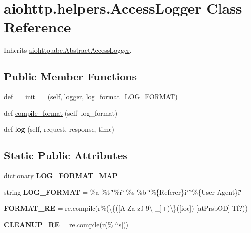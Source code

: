 \hypertarget{classaiohttp_1_1helpers_1_1_access_logger}{}\section{aiohttp.\+helpers.\+Access\+Logger Class Reference}
\label{classaiohttp_1_1helpers_1_1_access_logger}


Inherits \hyperlink{classaiohttp_1_1abc_1_1_abstract_access_logger}{aiohttp.\+abc.\+Abstract\+Access\+Logger}.

\subsection*{Public Member Functions}
\begin{DoxyCompactItemize}
\item 
def \hyperlink{classaiohttp_1_1helpers_1_1_access_logger_ad0d3b542f6036f62cd3c10593dd225a1}{\+\_\+\+\_\+init\+\_\+\+\_\+} (self, logger, log\+\_\+format=L\+O\+G\+\_\+\+F\+O\+R\+M\+AT)
\item 
def \hyperlink{classaiohttp_1_1helpers_1_1_access_logger_a9e53e1bdb16592c153a0ce7400acc1b8}{compile\+\_\+format} (self, log\+\_\+format)
\item 
\mbox{\label{classaiohttp_1_1helpers_1_1_access_logger_af5f0a5b71ffd18e9d121511216a8eb6d}} 
def {\bfseries log} (self, request, response, time)
\end{DoxyCompactItemize}
\subsection*{Static Public Attributes}
\begin{DoxyCompactItemize}
\item 
dictionary {\bfseries L\+O\+G\+\_\+\+F\+O\+R\+M\+A\+T\+\_\+\+M\+AP}
\item 
\mbox{\label{classaiohttp_1_1helpers_1_1_access_logger_afe6ba89c38a66f34c42fd1c1dd0f79a1}} 
string {\bfseries L\+O\+G\+\_\+\+F\+O\+R\+M\+AT} = \textquotesingle{}\%a \%t \char`\"{}\%r\char`\"{} \%s \%b \char`\"{}\%\{Referer\}i\char`\"{} \char`\"{}\%\{User-\/Agent\}i\char`\"{}\textquotesingle{}
\item 
\mbox{\label{classaiohttp_1_1helpers_1_1_access_logger_a03b48291f5f79abb3907e703841a9e63}} 
{\bfseries F\+O\+R\+M\+A\+T\+\_\+\+RE} = re.\+compile(r\textquotesingle{}\%(\textbackslash{}\{(\mbox{[}A-\/Za-\/z0-\/9\textbackslash{}-\/\+\_\+\mbox{]}+)\textbackslash{}\}(\mbox{[}ioe\mbox{]})$\vert$\mbox{[}at\+Prsb\+OD\mbox{]}$\vert$Tf?)\textquotesingle{})
\item 
\mbox{\label{classaiohttp_1_1helpers_1_1_access_logger_ac3c77c6cc096645c4072d7b35f4a6c67}} 
{\bfseries C\+L\+E\+A\+N\+U\+P\+\_\+\+RE} = re.\+compile(r\textquotesingle{}(\%\mbox{[}$^\wedge$s\mbox{]})\textquotesingle{})
\end{DoxyCompactItemize}
